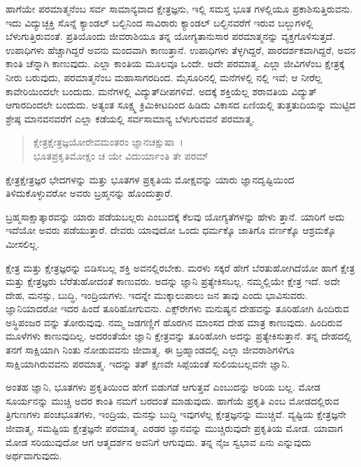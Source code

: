 ಹಾಗೆಯೇ ಪರಮಾತ್ಮನೆಂಬ ಸರ್ವ ಸಾಮಾನ್ಯವಾದ ಕ್ಷೇತ್ರಜ್ಞನು, ಇಲ್ಲಿ ಸಮಸ್ತ ಭೂತ ಗಳಲ್ಲಿಯೂ ಪ್ರಕಾಶಿಸುತ್ತಿರುವನು. ಇದು ವಿದ್ಯುಚ್ಛಕ್ತಿ ಸೊನ್ನೆ ಕ್ಯಾಂಡಲ್ ಬಲ್ಬಿನಿಂದ ಸಾವಿರಾರು ಕ್ಯಾಂಡಲ್ ಬಲ್ಬಿನವರೆಗೆ ಇರುವ ಬಲ್ಬುಗಳಲ್ಲಿ ಬೆಳುಗುತ್ತಿರುವಂತೆ. ಪ್ರತಿಯೊಂದು ಜೀವರಾಶಿಯೂ ತನ್ನ ಯೋಗ್ಯತಾನುಸಾರ ಪರಮಾತ್ಮನನ್ನು ವ್ಯಕ್ತಗೊಳಿಸುತ್ತದೆ. ಉಪಾಧಿಗಳು ಹೆಚ್ಚಾಗಿದ್ದರೆ ಅವನು ಮಂದವಾಗಿ ಕಾಣುತ್ತಾನೆ. ಉಪಾಧಿಗಳು ತೆಳ್ಳಗಿದ್ದರೆ, ಪಾರದರ್ಶಕವಾಗಿದ್ದರೆ, ಅವನ ಕಾಂತಿ ಚೆನ್ನಾಗಿ ಕಾಣುವುದು. ಎಲ್ಲಾ ಕಾಂತಿಯ ಮೂಲವೂ ಒಂದೇ. ಅದೇ ಪರಮಾತ್ಮ. ಎಲ್ಲಾ ಜೀವಿಗಳೆಂಬ ಕ್ಷೇತ್ರಕ್ಕೆ ನೀರು ಬರುವುದು, ಪರಮಾತ್ಮನೆಂಬ ಮಹಾಸಾಗರದಿಂದ. ಮೈಸೂರಿನಲ್ಲಿ ಮನೆಗಳಲ್ಲಿ ನಲ್ಲಿ ಇವೆ; ಆ ನೀರೆಲ್ಲ ಕಾವೇರಿಯಿಂದಲೇ ಬಂದುದು. ಮನೆಗಳಲ್ಲಿ ವಿದ್ಯುತ್​ದೀಪಗಳಿವೆ. ಅದಕ್ಕೆ ಶಕ್ತಿಯೆಲ್ಲ ಶರಾವತಿಯ ವಿದ್ಯುತ್ ಆಗಾರದಿಂದಲೇ ಬಂದುದು. ಅತ್ಯಂತ ಸೂಕ್ಷ್ಮ ಕ್ರಿಮಿಕೀಟದಿಂದ ಹಿಡಿದು ವಿಕಾಸದ ಏಣಿಯಲ್ಲಿ ತುತ್ತತುದಿಯನ್ನು ಮುಟ್ಟಿದ ಶ್ರೇಷ್ಠ ಮಾನವನವರೆಗೆ ಎಲ್ಲಾ ಕಡೆಯಲ್ಲಿ ಸರ್ವಸಾಮಾನ್ಯ ಬೆಳುಗುವವನೆ ಪರಮಾತ್ಮ.

\begin{verse}
ಕ್ಷೇತ್ರಕ್ಷೇತ್ರಜ್ಞಯೋರೇವಮಂತರಂ ಜ್ಞಾನಚಕ್ಷುಷಾ~।\\ಭೂತಪ್ರಕೃತಿಮೋಕ್ಷಂ ಚ ಯೇ ವಿದುರ್ಯಾಂತಿ ತೇ ಪರಮ್ 
\end{verse}

{\small ಕ್ಷೇತ್ರಕ್ಷೇತ್ರಜ್ಞರ ಭೇದಗಳನ್ನು ಮತ್ತು ಭೂತಗಳ ಪ್ರಕೃತಿಯ ಮೋಕ್ಷವನ್ನು ಯಾರು ಜ್ಞಾನದೃಷ್ಟಿಯಿಂದ ತಿಳಿದುಕೊಳ್ಳುವರೋ ಅವರು ಬ್ರಹ್ಮನನ್ನು ಹೊಂದುತ್ತಾರೆ.}

ಬ್ರಹ್ಮಸಾಕ್ಷಾತ್ಕಾರವನ್ನು ಯಾರು ಪಡೆಯಬಲ್ಲರು ಎಂಬುದಕ್ಕೆ ಕೆಲವು ಯೋಗ್ಯತೆಗಳನ್ನು ಹೇಳು ತ್ತಾನೆ. ಯಾರಿಗೆ ಅದು ಇದೆಯೋ ಅವರು ಪಡೆಯುತ್ತಾರೆ. ದೇವರು ಯಾವುದೋ ಒಂದು ಧರ್ಮಕ್ಕೊ ಜಾತಿಗೊ ವರ್ಣಕ್ಕೊ ಆಶ್ರಮಕ್ಕೊ ಮೀಸಲಿಲ್ಲ.

ಕ್ಷೇತ್ರ ಮತ್ತು ಕ್ಷೇತ್ರಜ್ಞರನ್ನು ಬಿಡಿಸಬಲ್ಲ ಶಕ್ತಿ ಅವನಲ್ಲಿರಬೇಕು. ಮರಳು ಸಕ್ಕರೆ ಹೇಗೆ ಬೆರತುಹೋಗಿದೆಯೋ ಹಾಗೆ ಕ್ಷೇತ್ರ ಮತ್ತು ಕ್ಷೇತ್ರಜ್ಞರು ಬೆರೆತುಹೋದಂತೆ ಕಾಣುವರು. ಅದನ್ನು ಜ್ಞಾನಿ ಪ್ರತ್ಯೇಕಿಸಬಲ್ಲ. ನಮ್ಮಲ್ಲಿಯೇ ಕ್ಷೇತ್ರ ಇದೆ. ಅದೇ ದೇಹ, ಮನಸ್ಸು, ಬುದ್ಧಿ, ಇಂದ್ರಿಯಗಳು. ಇದನ್ನೇ ಮುಕ್ಕಾಲುಪಾಲು ಜನ ತಾವು ಎಂದು ಭಾವಿಸುವರು. ಜ್ಞಾನಿಯಾದರೋ ಇದರ ಹಿಂದೆ ತೂರಿಹೋಗುವನು. ಎಕ್ಸ್​ರೇಗಳು ಮನುಷ್ಯನ ದೇಹವನ್ನು ತೂರಿಹೋಗಿ ಹಿಂದಿರುವ ಅಸ್ಥಿಪಂಜರ ವನ್ನು ತೋರುವುವು. ನಮ್ಮ ಜಡಗಣ್ಣಿಗೆ ಹೊರಗಿನ ಮಾಂಸದ ದೇಹ ಮಾತ್ರ ಕಾಣುವುದು. ಹಿಂದಿರುವ ಮೂಳೆಗಳು ಕಾಣುವುದಿಲ್ಲ. ಅದರಂತೆಯೇ ಜ್ಞಾನಿ ಕ್ಷೇತ್ರವನ್ನು ತೂರಿಹೋಗಿ ಅದನ್ನು ಪ್ರತ್ಯೇಕಿಸುತ್ತಾನೆ. ತನ್ನ ದೇಹದಲ್ಲಿ ತನಗೆ ಸಾಕ್ಷಿಯಾಗಿ ನಿಂತು ನೋಡುವವನು ಜೀವಾತ್ಮ. ಈ ಬ್ರಹ್ಮಾಂಡದಲ್ಲಿ ಎಲ್ಲಾ ಜೀವರಾಶಿಗಳಿಗೂ ಸಾಕ್ಷಿಯಾಗಿರುವವನು ಪರಮಾತ್ಮ. ಇದನ್ನು ತತ್ ಕ್ಷಣವೇ ಸಿಪ್ಪೆಯಂತೆ ಸುಲಿಯಬಲ್ಲವನೇ ಜ್ಞಾನಿ.

ಅಂತಹ ಜ್ಞಾನಿ, ಭೂತಗಳು ಪ್ರಕೃತಿಯಿಂದ ಹೇಗೆ ಬಿಡುಗಡೆ ಆಗುತ್ತವೆ ಎಂಬುದನ್ನು ಅರಿಯ ಬಲ್ಲ. ಮೋಡ ಸೂರ್ಯನನ್ನು ಮುಚ್ಚಿ ಅದರ ಕಾಂತಿ ನಮಗೆ ಬರದಂತೆ ಮಾಡುವುದು. ಹಾಗೆಯೆ ಪ್ರಕೃತಿ ಎಂಬ ಮೋಡದಲ್ಲಿರುವ ತ್ರಿಗುಣಗಳು ಪಂಚಭೂತಗಳು, ಇಂದ್ರಿಯ, ಮನಸ್ಸು ಬುದ್ಧಿ ಇವುಗಳೆಲ್ಲ ಕ್ಷೇತ್ರಜ್ಞನನ್ನು ಮುಚ್ಚಿವೆ. ವ್ಯಷ್ಟಿಯ ಕ್ಷೇತ್ರಜ್ಞನೇ ಜೀವಾತ್ಮ, ಸಮಷ್ಟಿಯ ಕ್ಷೇತ್ರಜ್ಞನೇ ಪರಮಾತ್ಮ. ಎರಡರ ಜ್ಞಾನವನ್ನು ಮುಚ್ಚಿರುವುದೇ ಪ್ರಕೃತಿಯ ಮೋಡ. ಯಾವಾಗ ಮೋಡ ಸರಿಯುವುದೋ ಆಗ ಆತ್ಮದರ್ಶನ ಅವನಿಗೆ ಆಗುವುದು. ತನ್ನ ನೈಜ ಸ್ವಭಾವ ಏನು ಎನ್ನುವುದು ಅರ್ಥವಾಗುವುದು.

